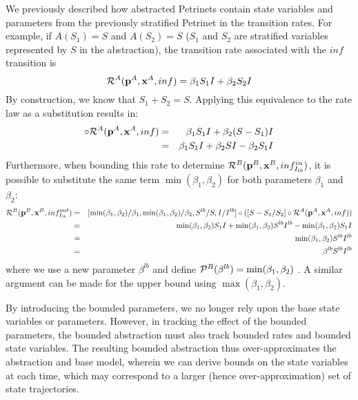 We previously described how abstracted Petrinets contain state variables and parameters from the previously stratified Petrinet in the transition rates.  For example, if $A(S_1) = S$ and $A(S_2) = S$ ($S_1$ and $S_2$ are stratified
variables represented by $S$ in the abstraction), the transition rate associated with the $inf$ transition is
\[{\cal R}^A({\bf p}^A, {\bf x}^A, {inf}) = \beta_1 S_1 I +  \beta_2 S_2 I\]
By construction, we know that $S_1 + S_2 = S$. Applying this equivalence to the rate law as a substitution results in:
\begin{eqnarray*}
    [S-S_1/S_2]\circ {\cal R}^A({\bf p}^A, {\bf x}^A, {inf}) &=& \beta_1 S_1 I +  \beta_2 (S-S_1) I\\
     &=& \beta_1 S_1 I +  \beta_2 S I -  \beta_2 S_1 I    
\end{eqnarray*}
Furthermore, when bounding this rate to determine ${\cal R}^B({\bf p}^B, {\bf x}^B, inf^{in}_{I_{lb}})$, it is possible to substitute the same term $\min(\beta_1, \beta_2)$ for both parameters $\beta_1$ and $\beta_2$:
\begin{eqnarray*}
    {\cal R}^B({\bf p}^B, {\bf x}^B, inf^{out}_{I_{lb}})&=&
    [\min(\beta_1, \beta_2)/\beta_1, \min(\beta_1, \beta_2)/\beta_2, S^{lb}/S, I/I^{lb}]\circ(  [S-S_1/S_2]\circ {\cal R}^A({\bf p}^A, {\bf x}^A, {inf})) \\
    &=& \min(\beta_1, \beta_2) S_1 I +   \min(\beta_1, \beta_2) S^{lb} I^{lb} -   \min(\beta_1, \beta_2) S_1 I  \\
     &=& \min(\beta_1, \beta_2) S^{lb} I^{lb}\\
     &=& \beta^{lb}S^{lb} I^{lb}
\end{eqnarray*}
where we use a new parameter $\beta^{lb}$ and define ${\cal P}^B(\beta^{lb}) = \min(\beta_1, \beta_2)$ .  A similar argument can be made for the upper bound using
$ \max(\beta_1, \beta_2)$.

By introducing the bounded parameters, we no longer rely upon the base state
variables or parameters.  However, in tracking the effect of the bounded
parameters, the bounded abstraction must also track bounded rates and bounded
state variables.  The resulting bounded abstraction thus over-approximates the
abstraction and base model, wherein we can derive bounds on the state variables
at each time, which may correspond to a larger (hence over-approximation) set of
state trajectories.

